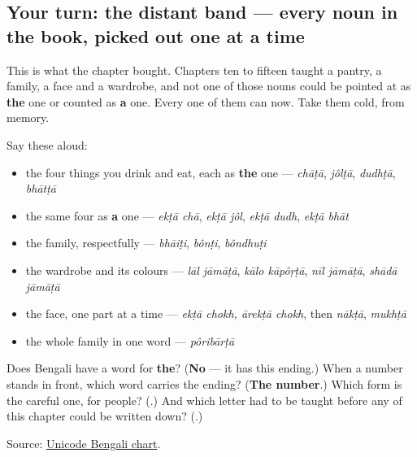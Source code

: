 \subsection*{Your turn: the distant band — every noun in the book, picked out one at a time}
This is what the chapter bought. Chapters ten to fifteen taught a pantry, a family, a face and a wardrobe, and not one of those nouns could be pointed at as \textbf{the} one or counted as \textbf{a} one. Every one of them can now. Take them cold, from memory.

Say these aloud:

\begin{itemize}
\raggedright
  \item the four things you drink and eat, each as \textbf{the} one — \emph{chāṭā}, \emph{jôlṭā}, \emph{dudhṭā}, \emph{bhātṭā}
  \item the same four as \textbf{a} one — \emph{ekṭā chā}, \emph{ekṭā jôl}, \emph{ekṭā dudh}, \emph{ekṭā bhāt}
  \item the family, respectfully — \emph{bhāiṭi}, \emph{bônṭi}, \emph{bôndhuṭi}
  \item the wardrobe and its colours — \emph{lāl jāmāṭā}, \emph{kālo kāpôṛṭā}, \emph{nīl jāmāṭā}, \emph{shādā jāmāṭā}
  \item the face, one part at a time — \emph{ekṭā chokh, ārekṭā chokh}, then \emph{nākṭā}, \emph{mukhṭā}
  \item the whole family in one word — \emph{pôribārṭā}
\end{itemize}

\begin{tcolorbox}[breakable,colback=teal!4,colframe=teal!35!black,title={Before you move on}]
Does Bengali have a word for \textbf{the}? (\textbf{No} — it has this ending.) When a number stands in front, which word carries the ending? (\textbf{The number}.) Which form is the careful one, for people? (\textbf{}.) And which letter had to be taught before any of this chapter could be written down? (\textbf{}.)

Source: \href{https://www.unicode.org/charts/PDF/U0980.pdf}{Unicode Bengali chart}.
\end{tcolorbox}
